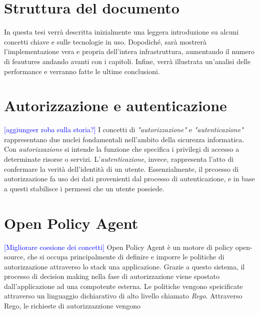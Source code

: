 \section{Struttura del documento}
In questa tesi verrà descritta inizialmente una leggera introduzione su alcuni concetti chiave e sulle tecnologie in uso. 
Dopodiché, sarà mostrerà l'implementazione vera e propria dell'intera infrastruttura, aumentando il numero di feautures andando avanti
con i capitoli. Infine, verrà illustrata un'analisi delle performance e verranno fatte le ultime conclusioni.  

\section{Autorizzazione e autenticazione}
\textcolor{blue}{[aggiungeer roba sulla storia?]}
I concetti di \textit{"autorizzazione"} e \textit{"autenticazione"} rappresentano due nuclei fondamentali nell'ambito 
della sicurezza informatica. Con \textit{autorizzazione} si intende la funzione che specifica i privilegi di accesso a determinate risorse o servizi. 
L'\textit{autenticazione}, invece, rappresenta l'atto di confermare la verità dell'identità di un utente.
Essenzialmente, il prcoesso di autorizzazione fa uso dei dati provenienti dal processo di autenticazione, e in base a questi stabilisce i 
permessi che un utente possiede.

\section{Open Policy Agent}
\textcolor{blue}{[Migliorare coesione dei concetti]}
Open Policy Agent è un motore di policy open-source, che si occupa principalmente di definire e imporre le politiche di autorizzazione attraverso lo stack una applicazione.
Grazie a questo sistema, il processo di decision making nella fase di autorizzazione viene spostato dall'applicazione ad una compotente esterna. 
\newline
Le politiche vengono speicificate attraverso un linguaggio dichiarativo di alto livello chiamato \textit{Rego}.
Attraverso Rego, le richieste di autorizzazzione vengono 